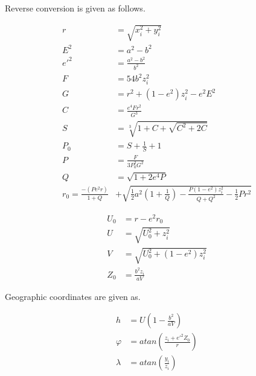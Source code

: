 Reverse conversion is given as follows. \cite{Zhu1994}

\begin{align}
  r    &= \sqrt{x_i^2+y_i^2} \\
  E^2  &= a^2 - b^2 \\
  e'^2 &= \frac{a^2-b^2}{b^2} \\
  F    &= 54 b^2 z_i^2 \\
  G    &= r^2 + \left( 1 - e^2 \right) z_i^2 - e^2 E^2 \\
  C    &= \frac{e^4 F r^2}{G^3} \\
  S    &= \sqrt[3]{1+C+\sqrt{C^2+2C}} \\
  P_0  &= S + \frac{1}{S} + 1 \\
  P    &= \frac{F}{3P_0^2 G^2} \\
  Q    &= \sqrt{1 + 2e^4 P} \\
  r_0  = \frac{-\left(Pe^2 r \right)}{1+Q} &+ \sqrt{\frac{1}{2}a^2 \left(1+\frac{1}{Q}\right) - \frac{P\left(1-e^2 \right)z_i^2}{Q+Q^2}-\frac{1}{2}Pr^2}
\end{align}


\begin{align}
  U_0  &= r - e^2 r_0 \\
  U    &= \sqrt{ U_0^2 + z_i^2 } \\
  V    &= \sqrt{ U_0^2 + \left( 1 - e^2 \right) z_i^2 } \\
  Z_0  &= \frac{b^2 z_i}{aV}
\end{align}

Geographic coordinates are given as.

\begin{align}
  h    &= U \left( 1 - \frac{b^2}{aV} \right) \\
  \varphi &= atan \left( \frac{z_i + e'^2 Z_0}{r} \right) \\
  \lambda &= atan \left( \frac{y_i}{z_i} \right)
\end{align}
